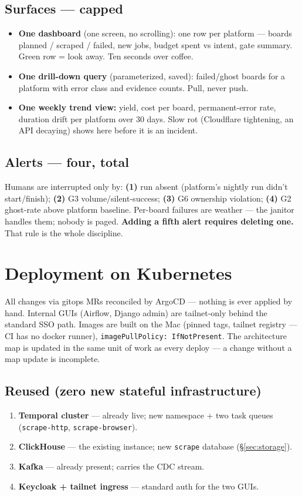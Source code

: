 \documentclass[11pt,a4paper]{article}
\begin{document}
\subsection{Surfaces --- capped}
\begin{itemize}
\item \textbf{One dashboard} (one screen, no scrolling): one row per platform --- boards planned / scraped
/ failed, new jobs, budget spent vs intent, gate summary. Green row = look away. Ten seconds over coffee.
\item \textbf{One drill-down query} (parameterized, saved): failed/ghost boards for a platform with error
class and evidence counts. Pull, never push.
\item \textbf{One weekly trend view:} yield, cost per board, permanent-error rate, duration drift per
platform over 30 days. Slow rot (Cloudflare tightening, an API decaying) shows here before it is an incident.
\end{itemize}

\subsection{Alerts --- four, total}
Humans are interrupted only by: \textbf{(1)} run absent (platform's nightly run didn't start/finish);
\textbf{(2)} G3 volume/silent-success; \textbf{(3)} G6 ownership violation; \textbf{(4)} G2 ghost-rate
above platform baseline. Per-board failures are weather --- the janitor handles them; nobody is paged.
\textbf{Adding a fifth alert requires deleting one.} That rule is the whole discipline.

\section{Deployment on Kubernetes}
\label{sec:deploy}

All changes via gitops MRs reconciled by ArgoCD --- nothing is ever applied by hand. Internal GUIs
(Airflow, Django admin) are tailnet-only behind the standard SSO path. Images are built on the Mac
(pinned tags, tailnet registry --- CI has no docker runner), \texttt{imagePullPolicy: IfNotPresent}.
The architecture map is updated in the same unit of work as every deploy --- a change without a map update
is incomplete.

\subsection{Reused (zero new stateful infrastructure)}
\begin{enumerate}
\item \textbf{Temporal cluster} --- already live; new namespace + two task queues
(\texttt{scrape-http}, \texttt{scrape-browser}).
\item \textbf{ClickHouse} --- the existing instance; new \texttt{scrape} database (\S\ref{sec:storage}).
\item \textbf{Kafka} --- already present; carries the CDC stream.
\item \textbf{Keycloak + tailnet ingress} --- standard auth for the two GUIs.
\end{enumerate}
\end{document}
